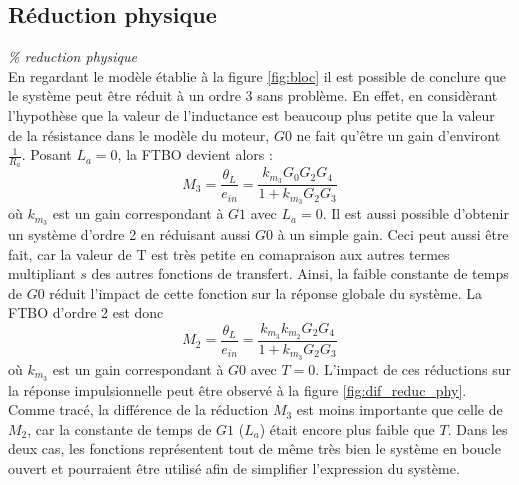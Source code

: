 \documentclass{udes_rapport} %
\begin{document}
\subsection{Réduction physique}
\textit{\% reduction physique} \\
En regardant le modèle établie à la figure \ref{fig:bloc} il est possible de conclure que le système peut être réduit à un ordre 3 sans problème. En effet, en considèrant l'hypothèse que la valeur de l'inductance est beaucoup plus petite que la valeur de la résistance dans le modèle du moteur, $G0$ ne fait qu'être un gain d'environt $\frac{1}{R_a}$. Posant $L_a = 0$, la FTBO devient alors :
\begin{equation}
M_3 = \frac{\theta_L}{e_{in}} = \frac{k_{m_3} G_0 G_2 G_4}{1 + k_{m_3} G_2 G_3}
\end{equation}
où $k_{m_3}$ est un gain correspondant à $G1$ avec $L_a = 0$.
Il est aussi possible d'obtenir un système d'ordre 2 en  réduisant aussi $G0$ à un simple gain. Ceci peut aussi être fait, car la valeur de T est très petite en comapraison aux autres termes multipliant $s$ des autres fonctions de transfert. Ainsi, la faible constante de temps de $G0$ réduit l'impact de cette fonction sur la réponse globale du système. La FTBO d'ordre 2 est donc
\begin{equation}
M_2 = \frac{\theta_L}{e_{in}} = \frac{k_{m_3} k_{m_2} G_2 G_4}{1 + k_{m_3} G_2 G_3}
\end{equation}
où $k_{m_3}$ est un gain correspondant à $G0$ avec $T = 0$.
L'impact de ces réductions sur la réponse impulsionnelle peut être observé à la figure \ref{fig:dif_reduc_phy}. Comme tracé, la différence de la réduction $M_3$ est moins importante que celle de $M_2$, car la constante de temps de $G1$ ($L_a$) était encore plus faible que $T$. Dans les deux cas, les fonctions représentent tout de même très bien le  système en boucle ouvert et pourraient être utilisé afin de simplifier l'expression du système.
\end{document}
